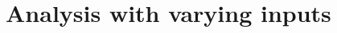 \documentclass[a4paper]{report}
\begin{document}
\section{Analysis with varying inputs}



%
%

%
%
\end{document}
